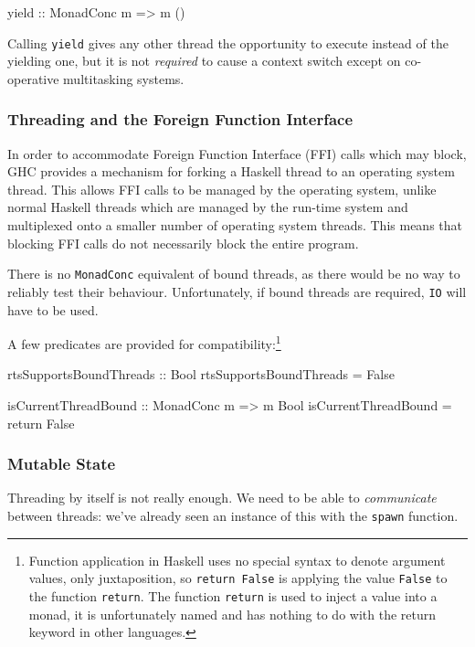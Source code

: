\begin{haskellcode}
yield :: MonadConc m => m ()
\end{haskellcode}

Calling \verb|yield| gives any other thread the opportunity to execute
instead of the yielding one, but it is not \emph{required} to cause a
context switch except on co-operative multitasking systems.

\subsubsection{Threading and the Foreign Function Interface}
\label{sec:abstraction-typeclass-ffithreads}

In order to accommodate Foreign Function Interface (FFI) calls which
may block, GHC provides a mechanism for forking a Haskell thread to an
operating system thread. This allows FFI calls to be managed by the
operating system, unlike normal Haskell threads which are managed by
the run-time system and multiplexed onto a smaller number of operating
system threads. This means that blocking FFI calls do not necessarily
block the entire program.

There is no \verb|MonadConc| equivalent of bound threads, as there
would be no way to reliably test their behaviour. Unfortunately, if
bound threads are required, \verb|IO| will have to be used.

A few predicates are provided for compatibility:\footnote{Function
  application in Haskell uses no special syntax to denote argument
  values, only juxtaposition, so \texttt{return False} is applying the
  value \texttt{False} to the function \texttt{return}. The function
  \texttt{return} is used to inject a value into a monad, it is
  unfortunately named and has nothing to do with the return keyword in
  other languages.}

\begin{haskellcode}
rtsSupportsBoundThreads :: Bool
rtsSupportsBoundThreads = False

isCurrentThreadBound :: MonadConc m => m Bool
isCurrentThreadBound = return False
\end{haskellcode}

\subsubsection{Mutable State}
\label{sec:abstraction-typeclass-crefs}

Threading by itself is not really enough. We need to be able to
\emph{communicate} between threads: we've already seen an instance
of this with the \verb|spawn| function.

